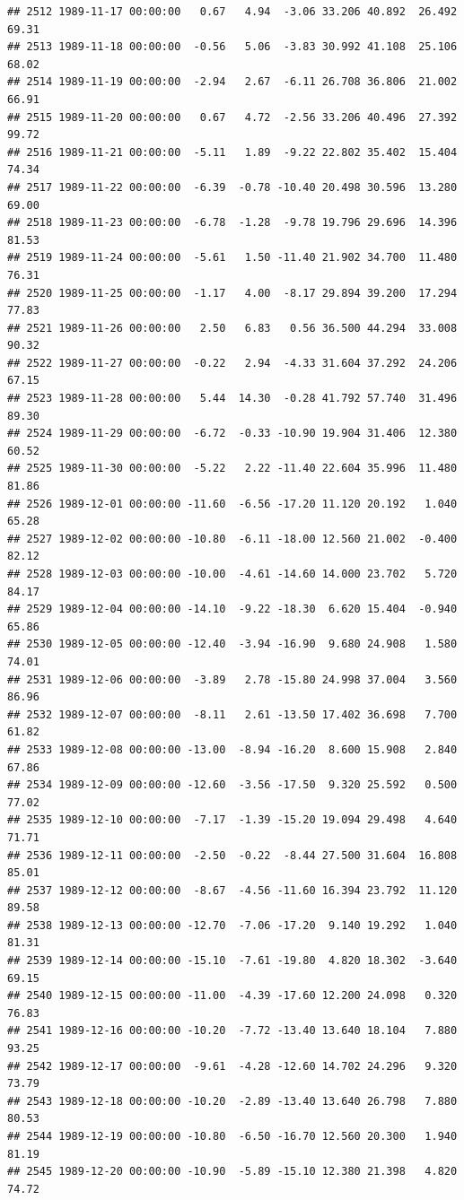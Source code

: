 \documentclass{article}\usepackage{graphicx, color}
\makeatletter
\newenvironment{kframe}{%
 \def\at@end@of@kframe{}%
 \ifinner\ifhmode%
  \def\at@end@of@kframe{\end{minipage}}%
  \begin{minipage}{\columnwidth}%
 \fi\fi%
 \def\FrameCommand##1{\hskip\@totalleftmargin \hskip-\fboxsep
 \colorbox{shadecolor}{##1}\hskip-\fboxsep
     \hskip-\linewidth \hskip-\@totalleftmargin \hskip\columnwidth}%
 \MakeFramed {\advance\hsize-\width
   \@totalleftmargin\z@ \linewidth\hsize
   \@setminipage}}%
 {\par\unskip\endMakeFramed%
 \at@end@of@kframe}
\newenvironment{knitrout}{}{} %
\makeatother
\begin{document}
\begin{knitrout}
\begin{kframe}
\begin{verbatim}
## 2512 1989-11-17 00:00:00   0.67   4.94  -3.06 33.206 40.892  26.492  69.31
## 2513 1989-11-18 00:00:00  -0.56   5.06  -3.83 30.992 41.108  25.106  68.02
## 2514 1989-11-19 00:00:00  -2.94   2.67  -6.11 26.708 36.806  21.002  66.91
## 2515 1989-11-20 00:00:00   0.67   4.72  -2.56 33.206 40.496  27.392  99.72
## 2516 1989-11-21 00:00:00  -5.11   1.89  -9.22 22.802 35.402  15.404  74.34
## 2517 1989-11-22 00:00:00  -6.39  -0.78 -10.40 20.498 30.596  13.280  69.00
## 2518 1989-11-23 00:00:00  -6.78  -1.28  -9.78 19.796 29.696  14.396  81.53
## 2519 1989-11-24 00:00:00  -5.61   1.50 -11.40 21.902 34.700  11.480  76.31
## 2520 1989-11-25 00:00:00  -1.17   4.00  -8.17 29.894 39.200  17.294  77.83
## 2521 1989-11-26 00:00:00   2.50   6.83   0.56 36.500 44.294  33.008  90.32
## 2522 1989-11-27 00:00:00  -0.22   2.94  -4.33 31.604 37.292  24.206  67.15
## 2523 1989-11-28 00:00:00   5.44  14.30  -0.28 41.792 57.740  31.496  89.30
## 2524 1989-11-29 00:00:00  -6.72  -0.33 -10.90 19.904 31.406  12.380  60.52
## 2525 1989-11-30 00:00:00  -5.22   2.22 -11.40 22.604 35.996  11.480  81.86
## 2526 1989-12-01 00:00:00 -11.60  -6.56 -17.20 11.120 20.192   1.040  65.28
## 2527 1989-12-02 00:00:00 -10.80  -6.11 -18.00 12.560 21.002  -0.400  82.12
## 2528 1989-12-03 00:00:00 -10.00  -4.61 -14.60 14.000 23.702   5.720  84.17
## 2529 1989-12-04 00:00:00 -14.10  -9.22 -18.30  6.620 15.404  -0.940  65.86
## 2530 1989-12-05 00:00:00 -12.40  -3.94 -16.90  9.680 24.908   1.580  74.01
## 2531 1989-12-06 00:00:00  -3.89   2.78 -15.80 24.998 37.004   3.560  86.96
## 2532 1989-12-07 00:00:00  -8.11   2.61 -13.50 17.402 36.698   7.700  61.82
## 2533 1989-12-08 00:00:00 -13.00  -8.94 -16.20  8.600 15.908   2.840  67.86
## 2534 1989-12-09 00:00:00 -12.60  -3.56 -17.50  9.320 25.592   0.500  77.02
## 2535 1989-12-10 00:00:00  -7.17  -1.39 -15.20 19.094 29.498   4.640  71.71
## 2536 1989-12-11 00:00:00  -2.50  -0.22  -8.44 27.500 31.604  16.808  85.01
## 2537 1989-12-12 00:00:00  -8.67  -4.56 -11.60 16.394 23.792  11.120  89.58
## 2538 1989-12-13 00:00:00 -12.70  -7.06 -17.20  9.140 19.292   1.040  81.31
## 2539 1989-12-14 00:00:00 -15.10  -7.61 -19.80  4.820 18.302  -3.640  69.15
## 2540 1989-12-15 00:00:00 -11.00  -4.39 -17.60 12.200 24.098   0.320  76.83
## 2541 1989-12-16 00:00:00 -10.20  -7.72 -13.40 13.640 18.104   7.880  93.25
## 2542 1989-12-17 00:00:00  -9.61  -4.28 -12.60 14.702 24.296   9.320  73.79
## 2543 1989-12-18 00:00:00 -10.20  -2.89 -13.40 13.640 26.798   7.880  80.53
## 2544 1989-12-19 00:00:00 -10.80  -6.50 -16.70 12.560 20.300   1.940  81.19
## 2545 1989-12-20 00:00:00 -10.90  -5.89 -15.10 12.380 21.398   4.820  74.72

\end{verbatim}
\end{kframe}
\end{knitrout}
\end{document}
